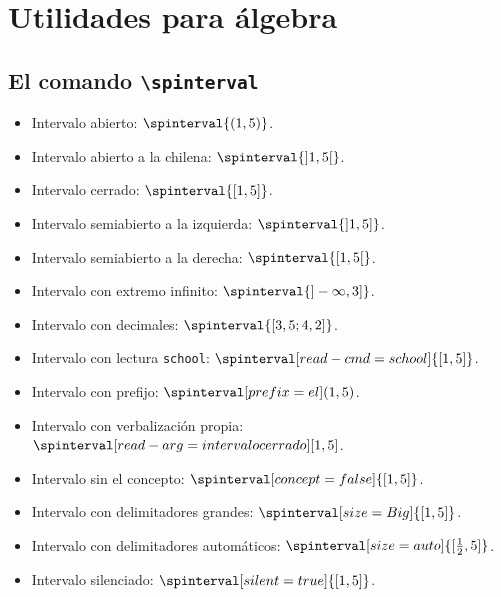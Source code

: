 \documentclass{article}
\begin{document}
\section*{Utilidades para álgebra}

\subsection*{El comando \texttt{\textbackslash spinterval}}

\begin{itemize}
  \item Intervalo abierto: $\spinterval{(1,5)}$.
  \item Intervalo abierto a la chilena: $\spinterval{]1,5[}$.
  \item Intervalo cerrado: $\spinterval{[1,5]}$.
  \item Intervalo semiabierto a la izquierda: $\spinterval{]1,5]}$.
  \item Intervalo semiabierto a la derecha: $\spinterval{[1,5[}$.
  \item Intervalo con extremo infinito: $\spinterval{]-\infty,3]}$.
  \item Intervalo con decimales: $\spinterval{[3,5;4,2]}$.
  \item Intervalo con lectura \texttt{school}: $\spinterval[read-cmd=school]{[1,5]}$.
  \item Intervalo con prefijo: $\spinterval[prefix={el}]{(1,5)}$.
  \item Intervalo con verbalización propia: $\spinterval[read-arg={intervalo cerrado}]{[1,5]}$.
  \item Intervalo sin el concepto: $\spinterval[concept=false]{[1,5]}$.
  \item Intervalo con delimitadores grandes: $\spinterval[size=Big]{[1,5]}$.
  \item Intervalo con delimitadores automáticos: $\spinterval[size=auto]{[\frac{1}{2},5]}$.
  \item Intervalo silenciado: $\spinterval[silent=true]{[1,5]}$.
\end{itemize}
\end{document}
